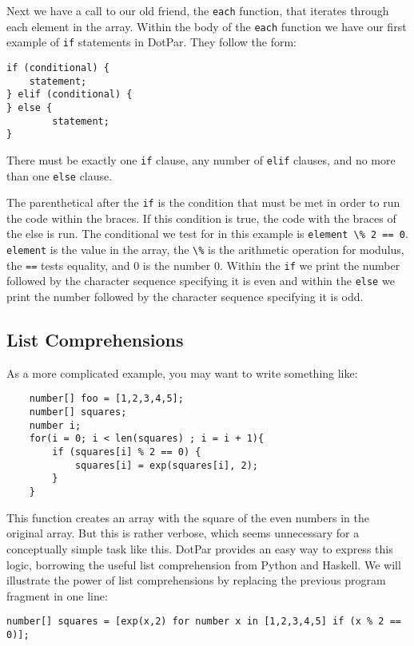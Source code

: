 \documentclass{article}
\begin{document}
Next we have a call to our old friend, the \verb!each! function, that iterates through each element in the array. Within the body of the \verb!each! function we have our first example of \verb!if! statements in DotPar. They follow the form: 

\begin{verbatim}
if (conditional) {
    statement;
} elif (conditional) {
} else {
        statement;
}
\end{verbatim}

There must be exactly one \verb!if! clause, any number of \verb!elif! clauses, and no more than one \verb!else! clause.

The parenthetical after the \verb!if! is the condition that must be met in order to run the code within the braces. If this condition is true, the code with the braces of the else is run. The conditional we test for in this example is \verb!element \% 2 == 0!. \verb!element! is the value in the array, the \verb!\%! is the arithmetic operation for modulus, the \verb!==! tests equality, and 0 is the number 0. Within the \verb!if! we print the number followed by the character sequence specifying it is even and within the \verb!else! we print the number followed by the character sequence specifying it is odd.

\subsection{List Comprehensions}
As a more complicated example, you may want to write something like:

\begin{verbatim}
    number[] foo = [1,2,3,4,5];
    number[] squares;
    number i;
    for(i = 0; i < len(squares) ; i = i + 1){
        if (squares[i] % 2 == 0) {
            squares[i] = exp(squares[i], 2);
        }
    }
\end{verbatim}

This function creates an array with the square of the even numbers in the original array. But this is rather verbose, which seems unnecessary for a conceptually simple task like this. DotPar provides an easy way to express this logic, borrowing the useful list comprehension from Python and Haskell. We will illustrate the power of list comprehensions by replacing the previous program fragment in one line:

\begin{verbatim}
number[] squares = [exp(x,2) for number x in [1,2,3,4,5] if (x % 2 == 0)];
\end{verbatim}
\end{document}
